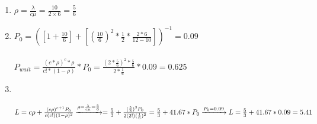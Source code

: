 \begin{enumerate}
  \item \phantom{text}
        \begin{latin}
          $\rho = \frac{\lambda}{c\mu } = \frac{10}{2\times6}=\frac{5}{6}$
        \end{latin}
  \item \phantom{text}
        \begin{latin}
          $P_0 = ([1 + \frac{10}{6}] + [(\frac{10}{6})^2*\frac{1}{2}*\frac{2 * 6}{12 - 10}])^{-1} = 0.09$
          \\\\
          $P_{wait} = \frac{(c*\rho)^c*\rho}{c!*(1-\rho)}*P_0 = \frac{(2*\frac{5}{6})^2*\frac{5}{6}}{2*\frac{1}{6}}*0.09 = 0.625$
        \end{latin}
  \item \phantom{text}
  \\
  \begin{latin}
    $L = c\rho + \frac{(c\rho)^{c+1}P_0}{c(c!)(1-\rho)^2} \xrightarrow[]{\rho = \frac{\lambda}{c\mu}=\frac{5}{6}}=\frac{5}{3} + \frac{(\frac{5}{3})^3P_0}{2(2!)(\frac{1}{6})^2} \\ 
    = \frac{5}{3} + 41.67 * P_0 \xrightarrow[]{P_0 = 0.09} L = \frac{5}{3} + 41.67 * 0.09 = 5.41$
  \end{latin}

\end{enumerate}

